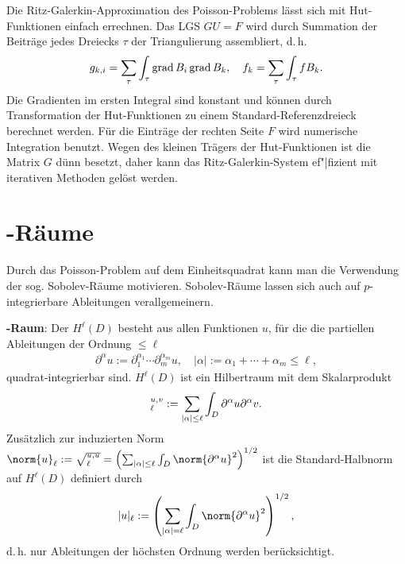 \linie

Die Ritz-Galerkin-Approximation des Poisson-Problems lässt sich mit Hut-Funktionen einfach
errechnen.
Das LGS $GU = F$ wird durch Summation der Beiträge jedes Dreiecks $\tau$ der Triangulierung
assembliert, d.\,h.
\begin{align*}
    g_{k,i} = \sum_\tau \int_\tau \operatorname{grad} B_i \operatorname{grad} B_k,\quad
    f_k = \sum_\tau \int_\tau f B_k.
\end{align*}
Die Gradienten im ersten Integral sind konstant und können durch Transformation der Hut-Funktionen
zu einem Standard-Referenzdreieck berechnet werden.
Für die Einträge der rechten Seite $F$ wird numerische Integration benutzt.
Wegen des kleinen Trägers der Hut-Funktionen ist die Matrix $G$ dünn besetzt,
daher kann das Ritz-Galerkin-System ef"|fizient mit iterativen Methoden gelöst werden.

\pagebreak

\section{%
    -Räume%
}

Durch das Poisson-Problem auf dem Einheitsquadrat kann man die Verwendung der sog.
Sobolev-Räume motivieren.
Sobolev-Räume lassen sich auch auf $p$-integrierbare Ableitungen verallgemeinern.

\textbf{-Raum}:
Der  $H^\ell(D)$ besteht aus allen Funktionen $u$, für die die
partiellen Ableitungen der Ordnung $\le \ell$
\begin{align*}
    \partial^\alpha u := \partial_1^{\alpha_1} \dotsm \partial_m^{\alpha_m} u,\quad
    |\alpha| := \alpha_1 + \dotsb + \alpha_m \le \ell,
\end{align*}
quadrat-integrierbar sind.
$H^\ell(D)$ ist ein Hilbertraum mit dem Skalarprodukt
\begin{align*}
    \sp{u, v}_\ell := \sum_{|\alpha| \le \ell} \int_D \partial^\alpha u \partial^\alpha v.
\end{align*}
Zusätzlich zur induzierten Norm
$\norm{u}_\ell := \sqrt{\sp{u, u}_\ell} =
\left(\sum_{|\alpha| \le \ell} \int_D \norm{\partial^\alpha u}^2\right)^{1/2}$ ist die
Standard-Halbnorm auf $H^\ell(D)$ definiert durch
\begin{align*}
    |u|_\ell := \left(\sum_{|\alpha| = \ell} \int_D \norm{\partial^\alpha u}^2\right)^{1/2},
\end{align*}
d.\,h. nur Ableitungen der höchsten Ordnung werden berücksichtigt.


